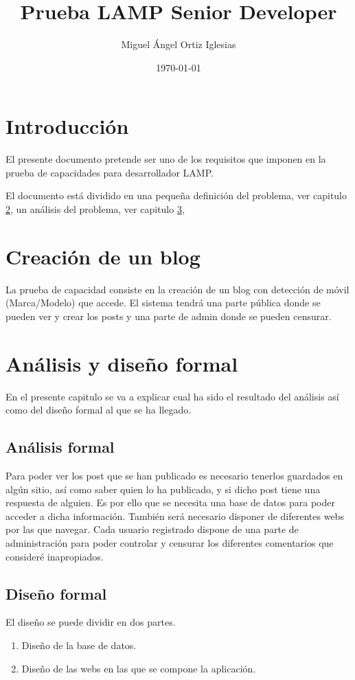 \documentclass[a4paper]{report}
\title{Prueba LAMP Senior Developer}
\author{Miguel Ángel Ortiz Iglesias}
\date{\today}
\begin{document}
	\maketitle
	\tableofcontents
	\chapter{Introducción}
	El presente documento pretende ser uno de los requisitos que imponen en la prueba de capacidades  para desarrollador LAMP.
	
	El documento está dividido en una pequeña definición del problema, ver capitulo \ref{definicion}, un análisis  del problema, ver capitulo \ref{analisis}, 
	\chapter{Creación de un blog}\label{definicion}
	La prueba de capacidad consiste en la creación de un blog con detección de móvil (Marca/Modelo) que accede. El sistema tendrá una parte pública donde se pueden ver y crear los posts y una parte de admin donde se pueden censurar.
	
	\chapter{Análisis y diseño formal}\label{analisis}
	En el presente capitulo se va a  explicar cual ha sido el resultado del análisis así como del diseño formal al que se ha llegado.
	\section{Análisis formal}
	Para poder ver los post que se han publicado es necesario tenerlos guardados en algún sitio, así como saber quien lo ha publicado, y si dicho post tiene una respuesta de alguien. Es por ello que se necesita una base de datos para poder acceder a dicha información.\newline
	También será necesario disponer de diferentes webs por las que navegar.\newline
	Cada usuario registrado dispone de una parte de administración para poder controlar y censurar los diferentes comentarios que consideré inapropiados.
	
	\section{Diseño formal}
	El diseño se puede dividir en dos partes.
	\begin{enumerate}
		\item Diseño de la base de datos.
		\item Diseño de las webs en las que se compone la aplicación.
	\end{enumerate}
	
\end{document}

